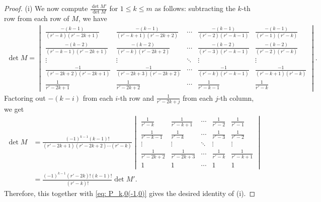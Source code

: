 \documentclass[11pt]{amsart}
\theoremstyle{definition}
\numberwithin{equation}{subsection}
\theoremstyle{plain}
\theoremstyle{plain}
\theoremstyle{plain}
\theoremstyle{plain}
\theoremstyle{plain}
\theoremstyle{plain}
\theoremstyle{plain}
\theoremstyle{plain}
\theoremstyle{plain}
\theoremstyle{plain}
\theoremstyle{plain}
\theoremstyle{plain}
\theoremstyle{definition}
\theoremstyle{definition}
\theoremstyle{definition}
\theoremstyle{remark}
\renewcommand{\(}{\textup{(}}
\renewcommand{\)}{\textup{)}}
\begin{document}
\begin{proof}
(i) We now compute $\frac{\det M'}{\det M}$ for $1\leq k\leq m$ as follows: subtracting the $k$-th row from each row of $M$, we have
    \begin{align*}
        \det M=
        \begin{vmatrix}
          \frac{-(k-1)}{(r'-k)(r'-2k+1)} & \frac{-(k-1)}{(r'-k+1)(r'-2k+2)} & \cdots
           & \frac{-(k-1)}{(r'-2)(r'-k-1)} & \frac{-(k-1)}{(r'-1)(r'-k)} \\
          \frac{-(k-2)}{(r'-k-1)(r'-2k+1)} & \frac{-(k-2)}{(r'-k)(r'-2k+2)} & \cdots
           & \frac{-(k-2)}{(r'-3)(r'-k-1)} & \frac{-(k-2)}{(r'-2)(r'-k)} \\
          \vdots & \vdots & \ddots & \vdots & \vdots \\
          \frac{-1}{(r'-2k+2)(r'-2k+1)} & \frac{-1}{(r'-2k+3)(r'-2k+2)} & \cdots
           & \frac{-1}{(r'-k)(r'-k-1)} & \frac{-1}{(r'-k+1)(r'-k)} \\
          \frac{1}{r'-2k+1} & \frac{1}{r'-2k+2} & \cdots & \frac{1}{r'-k-1} & \frac{1}{r'-k}
        \end{vmatrix}.
    \end{align*}
Factoring out $-(k-i)$ from each $i$-th row and $\frac{1}{r'-2k+j}$ from each $j$-th column, we get
    \begin{align*}
    \det M
        &=
        \frac{(-1)^{k-1} (k-1)!}{(r'-2k+1)(r'-2k+2)\cdots(r'-k)}
        \begin{vmatrix}
          \frac{1}{r'-k} & \frac{1}{r'-k+1} & \cdots & \frac{1}{r'-2} & \frac{1}{r'-1} \\
          \frac{1}{r'-k-1} & \frac{1}{r'-k} & \cdots & \frac{1}{r'-3} & \frac{1}{r'-2} \\
          \vdots & \vdots & \ddots & \vdots & \vdots \\
          \frac{1}{r'-2k+2} & \frac{1}{r'-2k+3} & \cdots & \frac{1}{r'-k} & \frac{1}{r'-k+1} \\
          1 & 1 & \cdots & 1 & 1
        \end{vmatrix}\\
        &=
        \frac{(-1)^{k-1} (r'-2k)!(k-1)!}{(r'-k)!}\det M'.
    \end{align*}
Therefore, this together with \eqref{eq: P_k,0(-1,0)} gives the desired identity of (i).


\end{proof}
\end{document}
